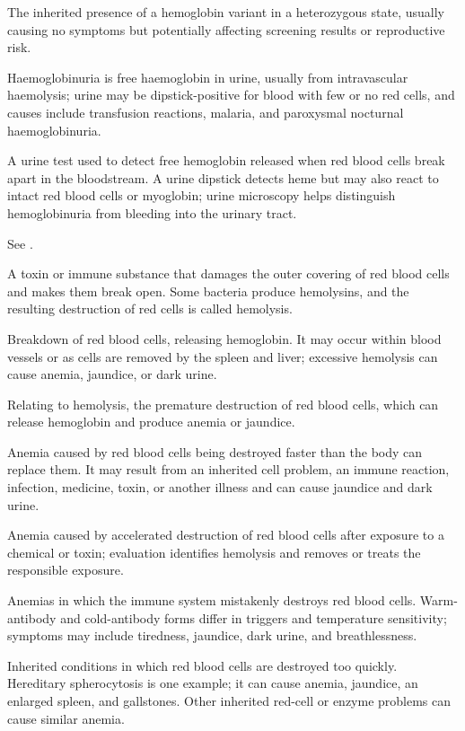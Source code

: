  The inherited presence of a hemoglobin variant in a heterozygous state, usually causing no symptoms but potentially affecting screening results or reproductive risk.

 Haemoglobinuria is free haemoglobin in urine, usually from intravascular haemolysis; urine may be dipstick-positive for blood with few or no red cells, and causes include transfusion reactions, malaria, and paroxysmal nocturnal haemoglobinuria.

 A urine test used to detect free hemoglobin released when red blood cells break apart in the bloodstream. A urine dipstick detects heme but may also react to intact red blood cells or myoglobin; urine microscopy helps distinguish hemoglobinuria from bleeding into the urinary tract.

 See .

 A toxin or immune substance that damages the outer covering of red blood cells and makes them break open. Some bacteria produce hemolysins, and the resulting destruction of red cells is called hemolysis.

 Breakdown of red blood cells, releasing hemoglobin. It may occur within blood vessels or as cells are removed by the spleen and liver; excessive hemolysis can cause anemia, jaundice, or dark urine.

 Relating to hemolysis, the premature destruction of red blood cells, which can release hemoglobin and produce anemia or jaundice.

 Anemia caused by red blood cells being destroyed faster than the body can replace them. It may result from an inherited cell problem, an immune reaction, infection, medicine, toxin, or another illness and can cause jaundice and dark urine.

 Anemia caused by accelerated destruction of red blood cells after exposure to a chemical or toxin; evaluation identifies hemolysis and removes or treats the responsible exposure.

 Anemias in which the immune system mistakenly destroys red blood cells. Warm-antibody and cold-antibody forms differ in triggers and temperature sensitivity; symptoms may include tiredness, jaundice, dark urine, and breathlessness.

 Inherited conditions in which red blood cells are destroyed too quickly. Hereditary spherocytosis is one example; it can cause anemia, jaundice, an enlarged spleen, and gallstones. Other inherited red-cell or enzyme problems can cause similar anemia.

